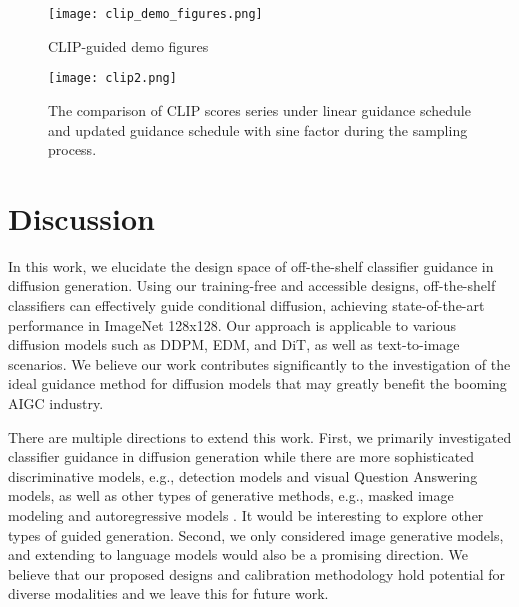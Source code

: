 \documentclass{article}
\theoremstyle{definition}
\begin{document}
\begin{figure}[h]
  \centering
\texttt{[image: clip\_demo\_figures.png]}
  \caption{CLIP-guided demo figures}
  \label{fig:clip_demo_figures}
\end{figure}

\begin{figure}[h]
  \centering
\texttt{[image: clip2.png]}
  \caption{The comparison of CLIP scores series under linear guidance schedule and updated guidance schedule with sine factor
 during the sampling process.}
  \label{fig:clip2}
\end{figure}


\section{Discussion} 
In this work, we elucidate the design space of off-the-shelf classifier guidance in diffusion generation.
Using our training-free and accessible designs, off-the-shelf classifiers can effectively guide conditional diffusion, achieving state-of-the-art performance in ImageNet 128x128. Our approach is applicable to various diffusion models such as DDPM, EDM, and DiT, as well as text-to-image scenarios. 
We believe our work contributes significantly to the investigation of the ideal guidance method for diffusion models that may greatly benefit the booming AIGC industry. 

There are multiple directions to extend this work.
First, we primarily investigated classifier guidance in diffusion generation while there are more sophisticated discriminative models, e.g., detection models and visual Question Answering models, as well as other types of generative methods, e.g., masked image modeling \citep{chang2022maskgit, chang2023muse} and autoregressive models \citep{esser2021taming, yu2022scaling, yu2023scaling}. It would be interesting to explore other types of guided generation. 
Second, we only considered image generative models, and extending to language models would also be a promising direction. 
We believe that our proposed designs and calibration methodology hold potential for diverse modalities and we leave this for future work.





\newpage

\appendix

\setcounter{page}{1}
\end{document}
